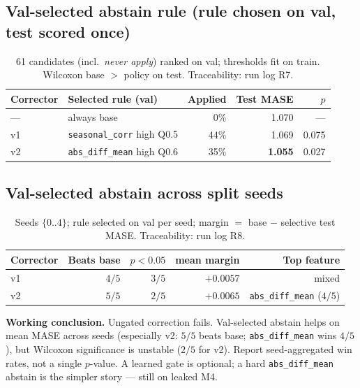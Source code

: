 \subsection*{Val-selected abstain rule (rule chosen on val, test scored once)}
\begin{table}[ht]
\centering
\small
\begin{tabular}{llrrr}
\toprule
Corrector & Selected rule (val) & Applied & Test MASE & $p$ \\
\midrule
--- & always base & 0\% & 1.070 & --- \\
v1 & \texttt{seasonal\_corr} high Q0.5 & 44\% & 1.069 & 0.075 \\
v2 & \texttt{abs\_diff\_mean} high Q0.6 & 35\% & \textbf{1.055} & 0.027 \\
\bottomrule
\end{tabular}
\caption{61 candidates (incl.\ \emph{never apply}) ranked on val; thresholds fit
on train. Wilcoxon base $>$ policy on test. Traceability: run log R7.}
\end{table}

\subsection*{Val-selected abstain across split seeds}
\begin{table}[ht]
\centering
\small
\begin{tabular}{lrrrr}
\toprule
Corrector & Beats base & $p<0.05$ & mean margin & Top feature \\
\midrule
v1 & $4/5$ & $3/5$ & $+0.0057$ & mixed \\
v2 & $5/5$ & $2/5$ & $+0.0065$ & \texttt{abs\_diff\_mean} ($4/5$) \\
\bottomrule
\end{tabular}
\caption{Seeds $\{0..4\}$; rule selected on val per seed; margin $=$ base $-$
selective test MASE. Traceability: run log R8.}
\end{table}

\noindent\textbf{Working conclusion.}
Ungated correction fails. Val-selected abstain helps on mean MASE across seeds
(especially v2: $5/5$ beats base; \texttt{abs\_diff\_mean} wins $4/5$), but
Wilcoxon significance is unstable ($2/5$ for v2). Report seed-aggregated win
rates, not a single $p$-value. A learned gate is optional; a hard
\texttt{abs\_diff\_mean} abstain is the simpler story --- still on leaked M4.

